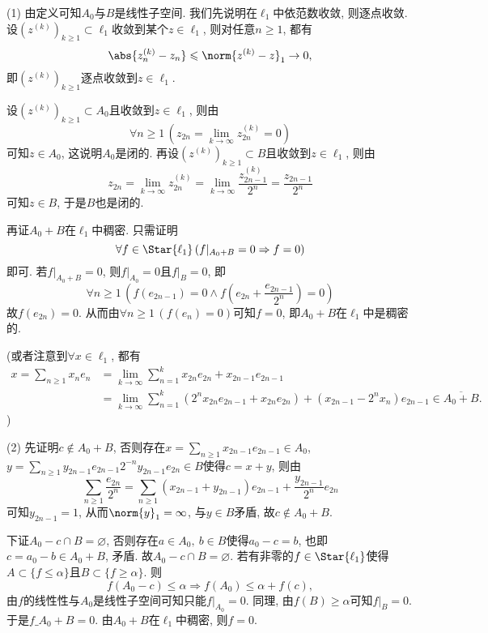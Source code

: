 	\begin{answer}
	(1) 由定义可知$ A_0 $与$ B $是线性子空间. 我们先说明在$ \ell_1 $中依范数收敛, 则逐点收敛. 设$ (z^{(k)})_{k\geqslant 1}\subset\ell_1 $收敛到某个$ z\in\ell_1 $, 则对任意$ n\geqslant 1 $, 都有
	\[
	\abs{z_n^{(k)}-z_n}\leqslant\norm{z^{(k)}-z}_1\to 0,
	\]
	即$ (z^{(k)})_{k\geqslant 1} $逐点收敛到$ z\in\ell_1 $.
	
	设$ (z^{(k)})_{k\geqslant 1}\subset A_0 $且收敛到$ z\in\ell_1 $, 则由
	\[
	\forall n\geqslant 1\,(z_{2n}=\lim_{k\to\infty}z_{2n}^{(k)}=0)
	\]
	可知$ z\in A_0 $, 这说明$ A_0 $是闭的. 再设$ (z^{(k)})_{k\geqslant 1}\subset B $且收敛到$ z\in\ell_1 $, 则由
	\[
	z_{2n}=\lim_{k\to\infty}z_{2n}^{(k)}=\lim_{k\to\infty}\frac{z_{2n-1}^{(k)}}{2^n}=\frac{z_{2n-1}}{2^n}
	\]
	可知$ z\in B $, 于是$ B $也是闭的.
	
	再证$ A_0+B $在$ \ell_1 $中稠密. 只需证明
	\[
	\forall f\in\Star{\ell_1}\,(f|_{A_0+B}=0\Rightarrow f=0)
	\]
	即可. 若$ f|_{A_0+B}=0 $, 则$ f|_{A_0}=0 $且$ f|_B=0 $, 即
	\[
	\forall n\geqslant 1\,\left(f(e_{2n-1})=0\land f\left(e_{2n}+\frac{e_{2n-1}}{2^n}\right)=0\right)
	\]
	故$ f(e_{2n})=0 $. 从而由$ \forall n\geqslant 1\,(f(e_n)=0) $可知$ f=0 $, 即$ A_0+B $在$ \ell_1 $中是稠密的.
	
	(或者注意到$ \forall x\in\ell_1 $, 都有
	\[
	\begin{aligned}
	x=\sum_{n\geqslant 1}x_ne_n&=\lim_{k\to\infty}\sum_{n=1}^kx_{2n}e_{2n}+x_{2n-1}e_{2n-1}\\
	&=\lim_{k\to\infty}\sum_{n=1}^k(2^nx_{2n}e_{2n-1}+x_{2n}e_{2n})+(x_{2n-1}-2^nx_n)e_{2n-1}\in\overline{A_0+B}.
	\end{aligned}
	\]
	)
	
	(2) 先证明$ c\notin A_0+B $, 否则存在$ x=\sum\limits_{n\geqslant 1}x_{2n-1}e_{2n-1}\in A_0 $, $ y=\sum\limits_{n\geqslant 1}y_{2n-1}e_{2n-1}2^{-n}y_{2n-1}e_{2n}\in B $使得$ c=x+y $, 则由
	\[
	\sum_{n\geqslant 1}\frac{e_{2n}}{2^n}=\sum_{n\geqslant 1}(x_{2n-1}+y_{2n-1})e_{2n-1}+\frac{y_{2n-1}}{2^n}e_{2n}
	\]
	可知$ y_{2n-1}=1 $, 从而$ \norm{y}_1=\infty $, 与$ y\in B $矛盾, 故$ c\notin A_0+B $.
	
	下证$ A_0-c\cap B=\varnothing $, 否则存在$ a\in A_0,\ b\in B $使得$ a_0-c=b $, 也即$ c=a_0-b\in A_0+B $, 矛盾. 故$ A_0-c\cap B=\varnothing $. 若有非零的$ f\in\Star{\ell_1} $使得$ A\subset\{ f\leqslant\alpha \} $且$ B\subset\{ f\geqslant\alpha \} $. 则
	\[
	f(A_0-c)\leqslant\alpha\Longrightarrow f(A_0)\leqslant\alpha+f(c),
	\]
	由$ f $的线性性与$ A_0 $是线性子空间可知只能$ f|_{A_0}=0 $. 同理, 由$ f(B)\geqslant\alpha $可知$ f|_B=0 $. 于是$ f\_{A_0+B}=0 $. 由$ A_0+B $在$ \ell_1 $中稠密, 则$ f=0 $.\qedhere
	\end{answer}
	

